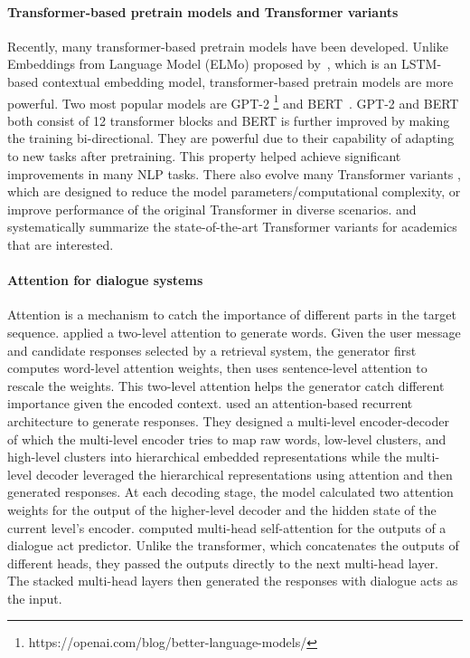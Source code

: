 \paragraph*{Transformer-based pretrain models and Transformer variants} Recently, many transformer-based pretrain models have been developed. Unlike Embeddings from Language Model (ELMo) proposed by~, which is an LSTM-based contextual embedding model, transformer-based pretrain models are more powerful. Two most popular models are GPT-2 \footnote{https://openai.com/blog/better-language-models/} and BERT~. GPT-2 and BERT both consist of 12 transformer blocks and BERT is further improved by making the training bi-directional. They are powerful due to their capability of adapting to new tasks after pretraining. This property helped achieve significant improvements in many NLP tasks. There also evolve many Transformer variants , which are designed to reduce the model parameters/computational complexity, or improve performance of the original Transformer in diverse scenarios.  and  systematically summarize the state-of-the-art Transformer variants for academics that are interested.\\
\paragraph*{Attention for dialogue systems} Attention is a mechanism to catch the importance of different parts in the target sequence.  applied a two-level attention to generate words. Given the user message and candidate responses selected by a retrieval system, the generator first computes word-level attention weights, then uses sentence-level attention to rescale the weights. This two-level attention helps the generator catch different importance given the encoded context.  used an attention-based recurrent architecture to generate responses. They designed a multi-level encoder-decoder of which the multi-level encoder tries to map raw words, low-level clusters, and high-level clusters into hierarchical embedded representations while the multi-level decoder leveraged the hierarchical representations using attention and then generated responses. At each decoding stage, the model calculated two attention weights for the output of the higher-level decoder and the hidden state of the current level's encoder.  computed multi-head self-attention for the outputs of a dialogue act predictor. Unlike the transformer, which concatenates the outputs of different heads, they passed the outputs directly to the next multi-head layer. The stacked multi-head layers then generated the responses with dialogue acts as the input. 
